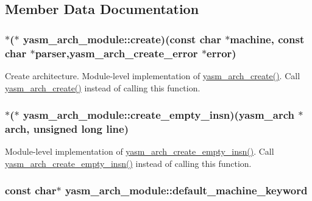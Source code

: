 \subsection{Member Data Documentation}
\hypertarget{structyasm__arch__module_a1c8c7a915d05db99e62b54a82d764231}{
\subsubsection[{create}]{$\ast$($\ast$ yasm\-\_\-arch\-\_\-module\-::create)(const char $\ast$machine, const char $\ast$parser,{\bf yasm\-\_\-arch\-\_\-create\-\_\-error} $\ast$error)}}\label{structyasm__arch__module_a1c8c7a915d05db99e62b54a82d764231}
Create architecture. Module-\/level implementation of \hyperlink{arch_8h_ac1aa673ef18339096cf4e2b387078bb3}{yasm\-\_\-arch\-\_\-create()}. Call \hyperlink{arch_8h_ac1aa673ef18339096cf4e2b387078bb3}{yasm\-\_\-arch\-\_\-create()} instead of calling this function. \hypertarget{structyasm__arch__module_aded6d7577574b5fdb988cff2d062fde4}{
\subsubsection[{create\-\_\-empty\-\_\-insn}]{$\ast$($\ast$ yasm\-\_\-arch\-\_\-module\-::create\-\_\-empty\-\_\-insn)({\bf yasm\-\_\-arch} $\ast$arch, unsigned long line)}}\label{structyasm__arch__module_aded6d7577574b5fdb988cff2d062fde4}
Module-\/level implementation of \hyperlink{arch_8h_ac9134bbe90f137ddcbca2266713156e9}{yasm\-\_\-arch\-\_\-create\-\_\-empty\-\_\-insn()}. Call \hyperlink{arch_8h_ac9134bbe90f137ddcbca2266713156e9}{yasm\-\_\-arch\-\_\-create\-\_\-empty\-\_\-insn()} instead of calling this function. \hypertarget{structyasm__arch__module_ab935f77e9d4fafaf06c3561219ed7e3c}{
\subsubsection[{default\-\_\-machine\-\_\-keyword}]{\setlength{\rightskip}{0pt plus 5cm}const char$\ast$ yasm\-\_\-arch\-\_\-module\-::default\-\_\-machine\-\_\-keyword}}\label{structyasm__arch__module_ab935f77e9d4fafaf06c3561219ed7e3c}
